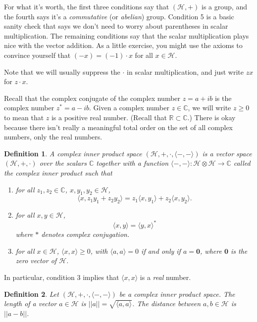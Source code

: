 \documentclass{article}
\newtheorem*{dfn}{Definition}
\newcommand{\bbC}{\mathbb{C}}
\newcommand{\calH}{\mathcal{H}}
\begin{document}
For what it's worth, the first three conditions say that $(\calH,+)$ is a group, and the fourth says it's a \emph{commutative} (or \emph{abelian}) group.  Condition 5 is a basic sanity check that says we don't need to worry about parentheses in scalar multiplication.  The remaining conditions say that the scalar multiplication plays nice with the vector addition.  As a little exercise, you might use the axioms to convince yourself that $(-x)=(-1)\cdot x$ for all $x \in \calH$.  

Note that we will usually suppress the $\cdot$ in scalar multiplication, and just write $zx$ for $z\cdot x$.

Recall that the complex conjugate of the complex number $z = a+ib$ is the complex number $z^* = a-ib$.  Given a complex number $z \in \bbC$, we will write $z \ge 0$ to mean that $z$ is a positive real number.  (Recall that $\mathbb{R} \subset \mathbb{C}$.)  There is okay because there isn't really a meaningful total order on the set of all complex numbers, only the real numbers.

\begin{dfn}
	A \emph{complex inner product space} $(\calH,+,\cdot,\langle-,-\rangle )$ is a vector space $(\mathcal{H}, +, \cdot)$ over the scalars $\bbC$ together with a function $\langle-,-\rangle : \mathcal{H}\otimes\mathcal{H}\to\mathbb{C}$ called the \emph{complex inner product} such that
	\begin{enumerate}
		\item for all $z_1,z_2 \in \bbC$, $x,y_1,y_2 \in \calH$, \[\langle x, z_1y_1+z_2y_2\rangle = z_1\langle x,y_1\rangle + z_2\langle x,y_2\rangle.\]
		\item for all $x,y \in \calH$, \[\langle x, y\rangle = \langle y, x\rangle^*\]
		where $*$ denotes complex conjugation.
		\item for all $x \in \calH$, $\langle x, x\rangle\geq 0$, with $\langle a, a\rangle = 0$ if and only if $a = \mathbf{0}$, where $\mathbf{0}$ is the zero vector of $\calH$.
	\end{enumerate}
\end{dfn}

In particular, condition 3 implies that $\langle x, x \rangle$ is a \emph{real} number.

\begin{dfn}
Let $(\calH,+,\cdot,\langle-,-\rangle )$ be a complex inner product space.
The {\em length} of a vector $a\in\mathcal{H}$ is $||a|| = \sqrt{\langle a, a\rangle}$.
The {\em distance} between $a, b\in\mathcal{H}$ is $||a - b||$.
\end{dfn}
\end{document}
